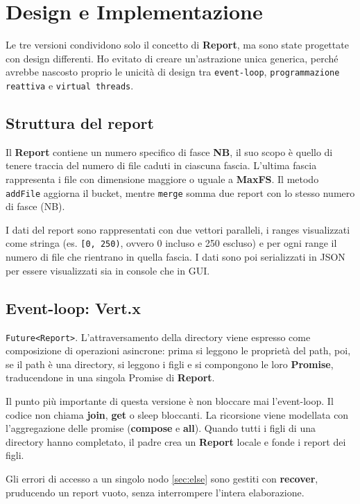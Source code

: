 \section{Design e Implementazione}
Le tre versioni condividono solo il concetto di \textbf{Report}, ma sono state progettate con design differenti. Ho evitato di creare un'astrazione unica generica, perché avrebbe nascosto proprio le unicità di design tra \texttt{event-loop}, \texttt{programmazione reattiva} e \texttt{virtual threads}.

\subsection{Struttura del report}
Il \textbf{Report} contiene un numero specifico di fasce \textbf{NB}, il suo scopo è quello di tenere traccia del numero di file caduti in ciascuna fascia. L'ultima fascia rappresenta i file con dimensione maggiore o uguale a \textbf{MaxFS}. Il metodo \texttt{addFile} aggiorna il bucket, mentre \texttt{merge} somma due report con lo stesso numero di fasce (NB).

I dati del report sono rappresentati con due vettori paralleli, i ranges visualizzati come stringa (es. \texttt{[0, 250)}, ovvero 0 incluso e 250 escluso) e per ogni range il numero di file che rientrano in quella fascia.
I dati sono poi serializzati in JSON per essere visualizzati sia in console che in GUI.

\subsection{Event-loop: Vert.x}
\texttt{Future<Report>}. L'attraversamento della directory viene espresso come composizione di operazioni asincrone: prima si leggono le proprietà del path, poi, se il path è una directory, si leggono i figli e si compongono le loro \textbf{Promise}, traducendone in una singola Promise di \textbf{Report}.

Il punto più importante di questa versione è non bloccare mai l'event-loop. Il codice non chiama \textbf{join}, \textbf{get} o sleep bloccanti. La ricorsione viene modellata con l'aggregazione delle promise (\textbf{compose} e \textbf{all}). Quando tutti i figli di una directory hanno completato, il padre crea un \textbf{Report} locale e fonde i report dei figli.

Gli errori di accesso a un singolo nodo \ref{sec:else} sono gestiti con \textbf{recover}, pruducendo un report vuoto, senza interrompere l'intera elaborazione.

